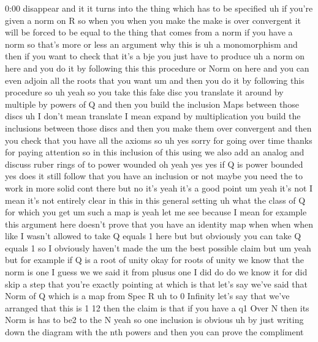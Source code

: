 \begin{unfinished}{0:00}
disappear  and  it  it  turns  into  the  thing
which  has  to  be
specified  uh  if  you're  given  a  norm  on  R
so  when  you  when  you  make  the  make  is
over  convergent  it  will  be  forced  to  be
equal  to  the  thing  that  comes  from  a
norm  if  you  have  a  norm  so  that's  more
or  less  an  argument  why  this  is  uh  a
monomorphism  and  then  if  you  want  to
check  that  it's  a  bje  you  just  have  to
produce  uh  a  norm  on  here  and  you  do  it
by  following  this  this  procedure  or  Norm
on  here  and  you  can  even  adjoin  all  the
roots  that  you  want  um  and  then  you  do
it  by  following  this  procedure  so  uh
yeah  so  you  take  this  fake  disc  you
translate  it  around  by  multiple  by
powers  of  Q  and  then  you  build  the
inclusion  Maps  between  those  discs  uh  I
don't  mean  translate  I  mean  expand  by
multiplication  you  build  the  inclusions
between  those  discs  and  then  you  make
them  over  convergent  and  then  you  check
that  you  have  all  the  axioms  so  uh  yes
sorry  for  going  over  time  thanks  for
paying  attention  so  in  this  inclusion  of
this
using  we  also  add  an  analog  and  discuss
ruber  rings  of  to  power
wounded  oh  yeah  yes  yes  if  Q  is  power
bounded  yes  does  it  still  follow  that
you  have  an  inclusion  or  not  maybe  you
need  the  to  work  in
more  solid  cont  there  but  no  it's  yeah
it's  a  good  point  um  yeah  it's  not  I
mean  it's  not  entirely  clear  in  this  in
this  general  setting  uh  what  the  class
of  Q  for  which  you  get  um  such  a  map  is
yeah  let  me
see
because  I  mean  for  example  this  argument
here  doesn't  prove  that  you  have  an
identity  map  when  when  when  like  I
wasn't  allowed  to  take  Q  equals  1  here
but  but  obviously  you  can  take  Q  equals
1  so  I  obviously  haven't  made  the  um  the
best  possible  claim  but  um  yeah  but  for
example  if  Q  is  a  root  of
unity  okay  for  roots  of  unity  we  know
that  the  norm  is  one  I  guess  we  we  said
it  from  plusus  one  I  did  do  do  we  know
it  for  did  skip  a  step  that  you're
exactly  pointing  at  which  is  that  let's
say  we've  said  that  Norm  of  Q  which  is  a
map  from  Spec  R  uh  to  0  Infinity  let's
say  that  we've  arranged  that  this  is  1
12  then  the  claim  is  that  if  you  have  a
q1  Over  N  then  its  Norm  is  has  to  be2  to
the  N
yeah  so  one  inclusion  is  obvious  uh  by
just  writing  down  the  diagram  with  the
nth  powers
and  then  you  can  prove  the  compliment

\end{unfinished}
